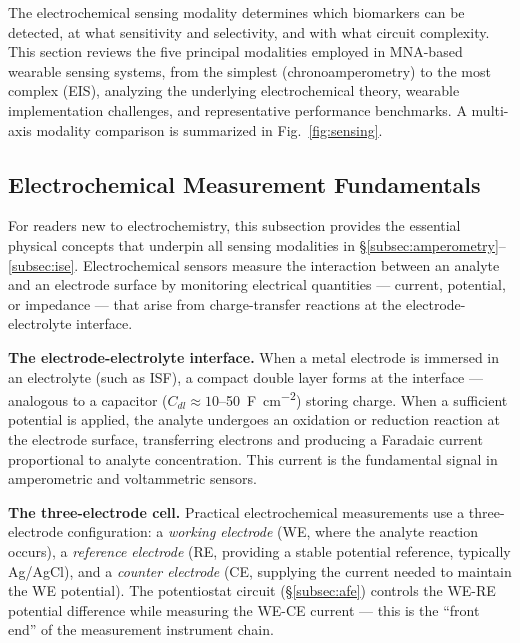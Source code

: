 \documentclass[review,1p]{elsarticle}
\begin{document}
The electrochemical sensing modality determines which biomarkers can be detected, at what sensitivity and selectivity, and with what circuit complexity. This section reviews the five principal modalities employed in MNA-based wearable sensing systems, from the simplest (chronoamperometry) to the most complex (EIS), analyzing the underlying electrochemical theory, wearable implementation challenges, and representative performance benchmarks. A multi-axis modality comparison is summarized in Fig.~\ref{fig:sensing}.

\subsection{Electrochemical Measurement Fundamentals}
\label{subsec:ec_fundamentals}

For readers new to electrochemistry, this subsection provides the essential physical concepts that underpin all sensing modalities in §\ref{subsec:amperometry}--\ref{subsec:ise}. Electrochemical sensors measure the interaction between an analyte and an electrode surface by monitoring electrical quantities — current, potential, or impedance — that arise from charge-transfer reactions at the electrode-electrolyte interface.

\textbf{The electrode-electrolyte interface.} When a metal electrode is immersed in an electrolyte (such as ISF), a compact double layer forms at the interface — analogous to a capacitor ($C_{dl} \approx 10$--50~\textmu{}F~cm\textsuperscript{$-2$}) storing charge. When a sufficient potential is applied, the analyte undergoes an oxidation or reduction reaction at the electrode surface, transferring electrons and producing a Faradaic current proportional to analyte concentration. This current is the fundamental signal in amperometric and voltammetric sensors.

\textbf{The three-electrode cell.} Practical electrochemical measurements use a three-electrode configuration: a \textit{working electrode} (WE, where the analyte reaction occurs), a \textit{reference electrode} (RE, providing a stable potential reference, typically Ag/AgCl), and a \textit{counter electrode} (CE, supplying the current needed to maintain the WE potential). The potentiostat circuit (\S\ref{subsec:afe}) controls the WE-RE potential difference while measuring the WE-CE current — this is the ``front end'' of the measurement instrument chain.
\end{document}
